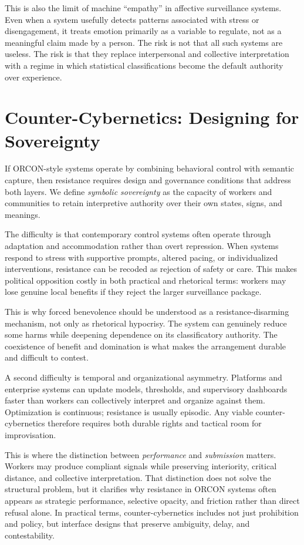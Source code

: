\documentclass[runningheads]{llncs}
\begin{document}
This is also the limit of machine ``empathy'' in affective surveillance systems. Even when a system usefully detects patterns associated with stress or disengagement, it treats emotion primarily as a variable to regulate, not as a meaningful claim made by a person. The risk is not that all such systems are useless. The risk is that they replace interpersonal and collective interpretation with a regime in which statistical classifications become the default authority over experience.

\section{Counter-Cybernetics: Designing for Sovereignty}

If ORCON-style systems operate by combining behavioral control with semantic capture, then resistance requires design and governance conditions that address both layers. We define \emph{symbolic sovereignty} as the capacity of workers and communities to retain interpretive authority over their own states, signs, and meanings.

The difficulty is that contemporary control systems often operate through adaptation and accommodation rather than overt repression. When systems respond to stress with supportive prompts, altered pacing, or individualized interventions, resistance can be recoded as rejection of safety or care. This makes political opposition costly in both practical and rhetorical terms: workers may lose genuine local benefits if they reject the larger surveillance package.

This is why forced benevolence should be understood as a resistance-disarming mechanism, not only as rhetorical hypocrisy. The system can genuinely reduce some harms while deepening dependence on its classificatory authority. The coexistence of benefit and domination is what makes the arrangement durable and difficult to contest.

A second difficulty is temporal and organizational asymmetry. Platforms and enterprise systems can update models, thresholds, and supervisory dashboards faster than workers can collectively interpret and organize against them. Optimization is continuous; resistance is usually episodic. Any viable counter-cybernetics therefore requires both durable rights and tactical room for improvisation.

This is where the distinction between \emph{performance} and \emph{submission} matters. Workers may produce compliant signals while preserving interiority, critical distance, and collective interpretation. That distinction does not solve the structural problem, but it clarifies why resistance in ORCON systems often appears as strategic performance, selective opacity, and friction rather than direct refusal alone. In practical terms, counter-cybernetics includes not just prohibition and policy, but interface designs that preserve ambiguity, delay, and contestability.
\end{document}
